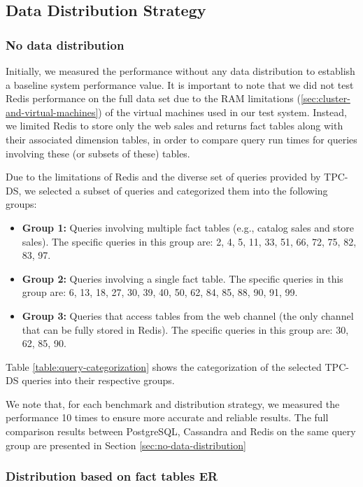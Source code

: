 \documentclass[conference]{IEEEtran}
\begin{document}
\subsection{Data Distribution Strategy}

\subsubsection{No data distribution}

Initially, we measured the performance without any data distribution to establish a
baseline system performance value. It is important to note that we did not test
Redis performance on the full data set due to the RAM limitations
(\ref{sec:cluster-and-virtual-machines}) of the virtual machines used in our test system.
Instead, we limited Redis to store only the web sales and returns fact tables along with
their associated dimension tables, in order to compare query run times for queries
involving these (or subsets of these) tables.

Due to the limitations of Redis and the diverse set of queries provided by TPC-DS,
we selected a subset of queries and categorized them into the following groups:

\begin{itemize}
	\item \textbf{Group 1:} Queries involving multiple fact tables (e.g., catalog sales and store sales). The specific queries in this group are: 2, 4, 5, 11, 33, 51, 66, 72, 75, 82, 83, 97.
	\item \textbf{Group 2:} Queries involving a single fact table. The specific queries in this group are: 6, 13, 18, 27, 30, 39, 40, 50, 62, 84, 85, 88, 90, 91, 99.
	\item \textbf{Group 3:} Queries that access tables from the web channel (the only channel that can be fully stored in Redis). The specific queries in this group are: 30, 62, 85, 90.
\end{itemize}

Table \ref{table:query-categorization} shows the categorization of the selected TPC-DS queries into their
respective groups.

We note that, for each benchmark and distribution strategy, we measured the performance 10 times
to ensure more accurate and reliable results.
The full comparison results between PostgreSQL, Cassandra and Redis on the same query group are presented in Section \ref{sec:no-data-distribution}

\subsubsection{Distribution based on fact tables ER}
\end{document}
